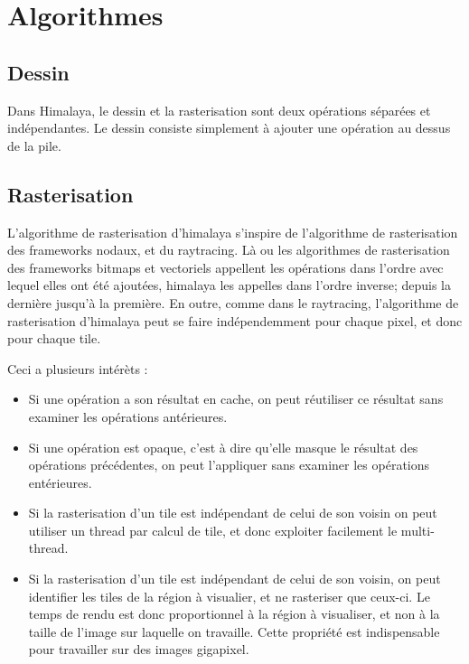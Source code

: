 	\section{Algorithmes}
		\subsection{Dessin}
		Dans Himalaya, le dessin et la rasterisation sont deux opérations séparées et indépendantes. Le dessin consiste simplement à ajouter une 
		opération au dessus de la pile.

		\subsection{Rasterisation}
		L'algorithme de rasterisation d'himalaya s'inspire de l'algorithme de rasterisation des frameworks nodaux, et du raytracing.
		Là ou les algorithmes de rasterisation des frameworks bitmaps et vectoriels appellent les opérations dans l'ordre avec lequel
		elles ont été ajoutées, himalaya les appelles dans l'ordre inverse; depuis la dernière jusqu'à la première.  En outre, comme dans
		le raytracing, l'algorithme de rasterisation d'himalaya peut se faire indépendemment pour chaque pixel, et donc pour chaque tile. 

		Ceci a plusieurs intérèts :
		\begin{itemize}
			\item Si une opération a son résultat en cache, on peut réutiliser ce résultat sans examiner les opérations antérieures.
			\item Si une opération est opaque, c'est à dire qu'elle masque le résultat des opérations précédentes, on peut l'appliquer
			sans examiner les opérations entérieures.
			\item Si la rasterisation d'un tile est indépendant de celui de son voisin on peut utiliser un thread par calcul de tile, et donc
			exploiter facilement le multi-thread.
			\item Si la rasterisation d'un tile est indépendant de celui de son voisin, on peut identifier les tiles de la région à visualier,
			et ne rasteriser que ceux-ci. Le temps de rendu est donc proportionnel à la région à visualiser, et non à la taille de l'image sur
			laquelle on travaille. Cette propriété est indispensable pour travailler sur des images gigapixel.
		\end{itemize}

